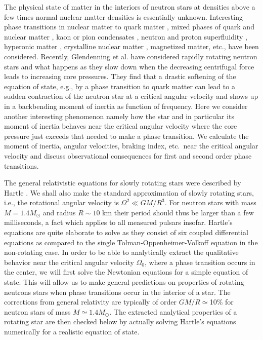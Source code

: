 \begin{multicols}{2}

The physical state of matter in the interiors of neutron stars at
densities above a few times normal nuclear matter densities is
essentially unknown. Interesting phase transitions in nuclear matter 
to quark matter \cite{star_properties},
mixed phases of quark and nuclear matter \cite{Glendenning,HPS}, kaon
\cite{Kaplan} or pion condensates \cite{pion,vijay}, 
neutron and proton superfluidity \cite{oeystein},
hyperonic matter \cite{star_properties,Glendenning},
crystalline nuclear matter \cite{pion}, magnetized matter, etc., have
been considered.  Recently, Glendenning et al. \cite{GPW} have
considered rapidly rotating neutron stars
and what happens as they slow down when the decreasing centrifugal
force leads to increasing core pressures.  They find that a drastic
softening of the equation of state, e.g., by a phase transition to
quark matter can lead to a sudden contraction of the neutron star at
a critical angular velocity and shows up in a backbending moment of
inertia as function of frequency.  Here we consider another
interesting phenomenon namely how the star and in particular its moment
of inertia behaves near the critical angular velocity where the core
pressure just exceeds that needed to make a phase transition. We
calculate the moment of inertia, angular velocities, braking
index, etc.\ near the critical angular velocity and discuss
observational consequences for first and second order phase
transitions.


The general relativistic equations for slowly rotating stars were 
described by Hartle \cite{Hartle}. 
We shall also make the standard approximation of slowly
rotating stars, i.e., the rotational angular velocity is
$\Omega^2 \ll GM/R^3$.
For neutron stars with mass $M=1.4M_\odot$ and
radius $R\sim 10$ km their period should thus be larger than a few
milliseconds, a fact which applies to all measured pulsars insofar.
Hartle's equations are quite elaborate to solve
as they consist of six coupled differential equations as compared to
the single Tolman-Oppenheimer-Volkoff 
equation \cite{TOV} in the non-rotating case.
In order to be able to analytically
extract the qualitative behavior near the critical angular velocity
$\Omega_0$, where a
phase transition occurs in the center, we will first solve the
Newtonian equations for a simple equation of state.
This will allow us to make general predictions on properties
of rotating neutrons stars when phase transitions occur in the interior
of a star.
The corrections from general relativity are typically of order
$GM/R\simeq$10\% for neutron stars of mass $M\simeq 1.4M_\odot$.
The extracted analytical properties of a rotating star 
are then  checked below by actually solving 
Hartle's equations numerically for a realistic equation of state.
 

\end{multicols}
